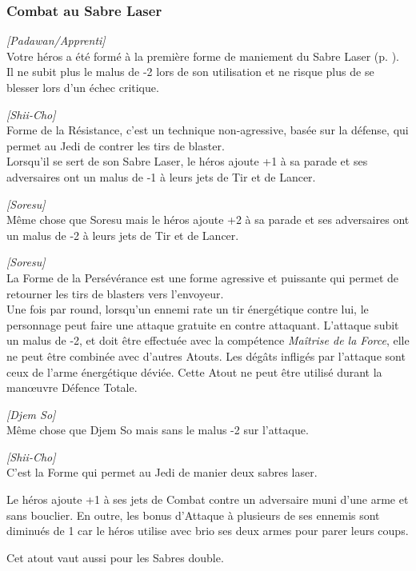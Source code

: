 \subsubsection{Combat au Sabre Laser}\label{itm:shiicho}
\begin{description}[align=left]
    \item [Shii-Cho]
        \emph{[Padawan/Apprenti]}\\
        Votre héros a été formé à la première forme de maniement du Sabre Laser (p. \pageref{sec:sabre-laser}). Il ne subit plus le malus de -2 lors de son utilisation et ne risque plus de se blesser lors d’un échec critique.

    \item [Soresu]
        \emph{[Shii-Cho]}\\
        Forme de la Résistance, c’est un technique non-agressive, basée sur la défense, qui permet au Jedi de contrer les tirs de blaster.\\
        Lorsqu’il se sert de son Sabre Laser, le héros ajoute +1 à sa parade et ses adversaires ont un malus de -1 à leurs jets de Tir et de Lancer.

    \item [Maître Soresu]
        \emph{[Soresu]}\\
        Même chose que Soresu mais le héros ajoute +2 à sa parade et ses adversaires ont un malus de -2 à leurs jets de Tir et de Lancer.

    \item [Djem So]
        \emph{[Soresu]}\\
        La Forme de la Persévérance est une forme agressive et puissante qui permet de retourner les tirs de blasters vers l’envoyeur. \\
        Une fois par round, lorsqu’un ennemi rate un tir énergétique contre lui, le personnage peut faire une attaque gratuite en contre attaquant. L’attaque subit un malus de -2, et doit être effectuée avec la compétence \emph{Maîtrise de la Force}, elle ne peut être combinée avec d’autres Atouts. Les dégâts infligés par l’attaque sont ceux de l’arme énergétique déviée. Cette Atout ne peut être utilisé durant la man\oe{uvre} Défence Totale.

    \item [Maître Djem So]
        \emph{[Djem So]}\\
        Même chose que Djem So mais sans le malus -2 sur l’attaque.

    \item [Jar’Kai]
        \emph{[Shii-Cho]}\\
        C'est la Forme qui permet au Jedi de manier deux sabres laser.

        Le héros ajoute +1 à ses jets de Combat contre un adversaire muni d’une arme et sans bouclier. En outre, les bonus d’Attaque à plusieurs de ses ennemis sont diminués de 1 car le héros utilise avec brio ses deux armes pour parer leurs coups.

        Cet atout vaut aussi pour les Sabres double.

\end{description}

